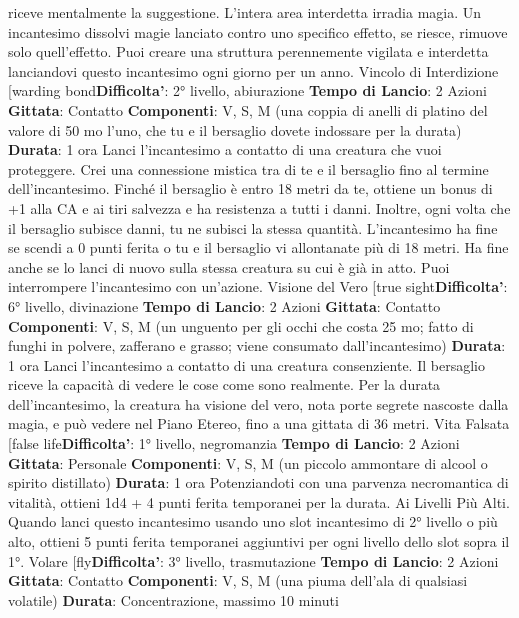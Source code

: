 \begin{multicols}{2}
riceve mentalmente la suggestione.
L’intera area interdetta irradia magia. Un incantesimo
dissolvi magie lanciato contro uno specifico effetto, se
riesce, rimuove solo quell’effetto.
Puoi creare una struttura perennemente vigilata e
interdetta lanciandovi questo incantesimo ogni giorno
per un anno.
Vincolo di Interdizione
[warding bond\textbf{Difficolta'}:
2° livello, abiurazione
\textbf{Tempo di Lancio}: 2 Azioni
\textbf{Gittata}: Contatto
\textbf{Componenti}: V, S, M (una coppia di anelli di platino del
valore di 50 mo l’uno, che tu e il bersaglio dovete
indossare per la durata)
\textbf{Durata}: 1 ora
Lanci l’incantesimo a contatto di una creatura che vuoi
proteggere. Crei una connessione mistica tra di te e il
bersaglio fino al termine dell’incantesimo. Finché il
bersaglio è entro 18 metri da te, ottiene un bonus di +1
alla CA e ai tiri salvezza e ha resistenza a tutti i danni.
Inoltre, ogni volta che il bersaglio subisce danni, tu ne
subisci la stessa quantità.
L’incantesimo ha fine se scendi a 0 punti ferita o tu e il
bersaglio vi allontanate più di 18 metri. Ha fine anche
se lo lanci di nuovo sulla stessa creatura su cui è già in
atto. Puoi interrompere l’incantesimo con un’azione.
Visione del Vero
[true sight\textbf{Difficolta'}:
6° livello, divinazione
\textbf{Tempo di Lancio}: 2 Azioni
\textbf{Gittata}: Contatto
\textbf{Componenti}: V, S, M (un unguento per gli occhi che
costa 25 mo; fatto di funghi in polvere, zafferano e
grasso; viene consumato dall’incantesimo)
\textbf{Durata}: 1 ora
Lanci l’incantesimo a contatto di una creatura
consenziente. Il bersaglio riceve la capacità di vedere le
cose come sono realmente. Per la durata
dell’incantesimo, la creatura ha visione del vero, nota
porte segrete nascoste dalla magia, e può vedere nel
Piano Etereo, fino a una gittata di 36 metri.
Vita Falsata
[false life\textbf{Difficolta'}:
1° livello, negromanzia
\textbf{Tempo di Lancio}: 2 Azioni
\textbf{Gittata}: Personale
\textbf{Componenti}: V, S, M (un piccolo ammontare di alcool
o spirito distillato)
\textbf{Durata}: 1 ora
Potenziandoti con una parvenza necromantica di
vitalità, ottieni 1d4 + 4 punti ferita temporanei per la
durata.
Ai Livelli Più Alti. Quando lanci questo incantesimo
usando uno slot incantesimo di 2° livello o più alto,
ottieni 5 punti ferita temporanei aggiuntivi per ogni
livello dello slot sopra il 1°.
Volare
[fly\textbf{Difficolta'}:
3° livello, trasmutazione
\textbf{Tempo di Lancio}: 2 Azioni
\textbf{Gittata}: Contatto
\textbf{Componenti}: V, S, M (una piuma dell’ala di qualsiasi
volatile)
\textbf{Durata}: Concentrazione, massimo 10 minuti

\end{multicols}
